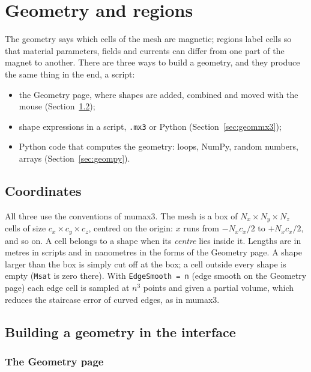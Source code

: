 \documentclass[11pt,a4paper,oneside]{book}
\newcommand{\code}[1]{\texttt{#1}}
\renewcommand{\_}{\textunderscore\allowbreak}
\newcommand{\menu}[1]{\textsf{#1}}
\begin{document}
\chapter{Geometry and regions}\label{ch:geometry}

The geometry says which cells of the mesh are magnetic; regions label cells so that material parameters,
fields and currents can differ from one part of the magnet to another. There are three ways to build a
geometry, and they produce the same thing in the end, a script:
\begin{itemize}
\item the \menu{Geometry} page, where shapes are added, combined and moved with the mouse
(Section~\ref{sec:geomui});
\item shape expressions in a script, \code{.mx3} or Python (Section~\ref{sec:geommx3});
\item Python code that computes the geometry: loops, NumPy, random numbers, arrays (Section~\ref{sec:geompy}).
\end{itemize}

\section{Coordinates}

All three use the conventions of mumax3. The mesh is a box of $N_x\times N_y\times N_z$ cells of size
$c_x\times c_y\times c_z$, centred on the origin: $x$ runs from $-N_xc_x/2$ to $+N_xc_x/2$, and so on. A cell
belongs to a shape when its \emph{centre} lies inside it. Lengths are in metres in scripts and in nanometres in
the forms of the Geometry page. A shape larger than the box is simply cut off at the box; a cell outside every
shape is empty (\code{Msat} is zero there). With \code{EdgeSmooth = n} (\menu{edge smooth} on the Geometry page)
each edge cell is sampled at $n^3$ points and given a partial volume, which reduces the staircase error of curved
edges, as in mumax3.

\section{Building a geometry in the interface}\label{sec:geomui}

\subsection{The Geometry page}
\end{document}
